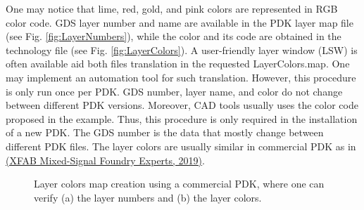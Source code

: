 \documentclass[10pt,a4paper,onecolumn]{article}
\begin{document}
One may notice that lime, red, gold, and pink colors are represented in
RGB color code. GDS layer number and name are available in the PDK layer
map file (see Fig. \ref{fig:LayerNumbers}), while the color and its code are obtained in
the technology file (see Fig. \ref{fig:LayerColors}). A user-friendly layer window (LSW)
is often available aid both files translation in the requested
LayerColors.map. One may implement an automation tool for such
translation. However, this procedure is only run once per PDK. GDS
number, layer name, and color do not change between different PDK
versions. Moreover, CAD tools usually uses the color code proposed in
the example. Thus, this procedure is only required in the installation
of a new PDK. The GDS number is the data that mostly change between
different PDK files. The layer colors are usually similar in commercial PDK as in \hyperlink{ref-XFAB2019}{(XFAB Mixed-Signal Foundry Experts, 2019)}.
\begin{figure}[ht]
 \begin{center}
   \caption{Layer colors map creation using a commercial PDK, where one can verify (a) the layer numbers and (b) the layer colors.}
 \end{center}
\end{figure}
\end{document}
